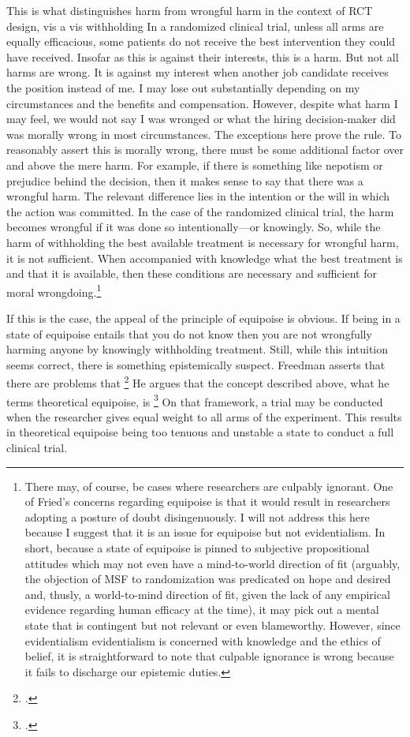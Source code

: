 \documentclass[letterpaper,notitlepage,12pt]{article}
\begin{document}
This is what distinguishes harm from wrongful harm in the context of RCT design,
vis a vis withholding
In a randomized clinical trial, unless all arms are equally
efficacious, some patients do not receive the best intervention they could
have received.
Insofar as this is against their interests, this is a harm.
But not all harms are wrong.
It is against my interest when another job candidate receives the position
instead of me.
I may lose out substantially depending on my circumstances and the benefits and
compensation.
However, despite what harm I may feel, we would not say I was wronged or what
the hiring decision-maker did was morally wrong in most circumstances.
The exceptions here prove the rule.
To reasonably assert this is morally wrong, there must be some
additional factor over and above the mere harm.
For example, if there is something like nepotism or prejudice behind the
decision, then it makes sense to say that there was a wrongful harm.
The relevant difference lies in the intention or the will in which the action
was committed.
In the case of the randomized clinical trial, the harm becomes wrongful if it
was done so intentionally---or knowingly.
So, while the harm of withholding the best available treatment is necessary for
wrongful harm, it is not sufficient.
When accompanied with knowledge what the best treatment is and that it is
available, then these conditions are necessary and sufficient for moral
wrongdoing.\footnote{There may, of course, be cases where researchers are
  culpably ignorant. One of Fried's concerns regarding equipoise is that it
  would result in researchers adopting a posture of doubt disingenuously. I will
  not address this here because I suggest that it is an issue for equipoise but
  not evidentialism. In short, because a state of equipoise is pinned to
  subjective propositional attitudes which may not even have a mind-to-world
  direction of fit (arguably, the objection of MSF to randomization was
  predicated on hope and desired and, thusly, a world-to-mind direction of fit,
  given the lack of any empirical evidence regarding human efficacy at the
  time), it may pick out a mental state that is contingent but not relevant or
  even blameworthy. However, since evidentialism evidentialism is concerned with
  knowledge and the ethics of belief, it is straightforward to note that
  culpable ignorance is wrong because it fails to discharge our epistemic
duties.}

If this is the case, the appeal of the principle of equipoise is obvious.
If being in a state of equipoise entails that you do not know then you are not
wrongfully harming anyone by knowingly withholding treatment.
Still, while this intuition seems correct, there is something epistemically
suspect.
Freedman asserts that there are problems that \footcite[p. 141]{freedman_equipoise_1987}
He argues that the concept described above, what he terms theoretical equipoise,
is \footcite[p.
429]{freedman_equipoise_1987}
On that framework, a trial may be conducted when the researcher gives equal
weight to all arms of the experiment.
This results in theoretical equipoise being too tenuous and unstable a state to conduct a full
clinical trial.
\end{document}
